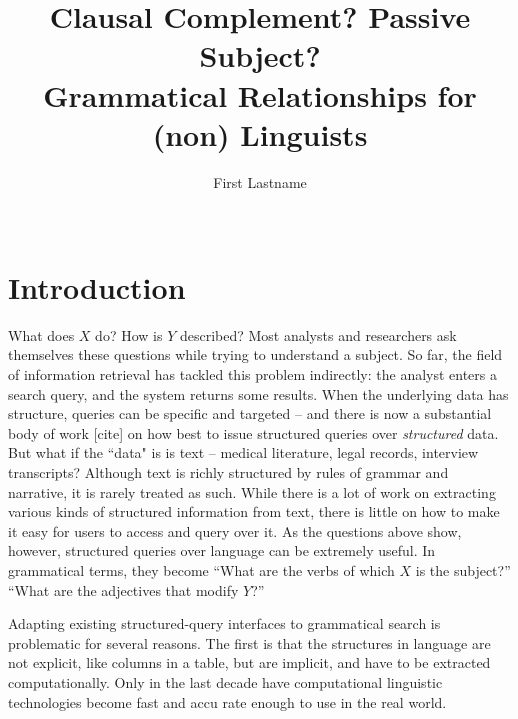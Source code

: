 \documentclass{sigchi}
\begin{document}
\title{Clausal Complement? Passive Subject?\\Grammatical Relationships for (non) Linguists}

\author{%
\alignauthor First Lastname\\
\\
}

\maketitle

\begin{abstract}

\end{abstract}

\section{Introduction}

What does $X$ do? How is $Y$ described? Most analysts and researchers ask themselves these questions while trying to understand a subject.  So far, the field of information retrieval has tackled this problem indirectly: the analyst enters a search query, and the system returns some results. When the underlying data has structure, queries can be specific and targeted -- and there is now a substantial body of work [cite] on how best to issue structured queries over \emph{structured} data. But what if the ``data" is is text -- medical literature, legal records, interview transcripts? Although text is richly structured by rules of  grammar and narrative, it is rarely treated as such. While there is a lot of work on extracting various kinds of structured information from text, there is little on how to make it easy for users to access and query over it.  As the questions above show, however, structured queries over language can be extremely useful. In grammatical terms, they become ``What are the verbs of which $X$ is the subject?'' ``What are the adjectives that modify $Y$?''

Adapting existing structured-query interfaces to grammatical search is problematic for several reasons. The first is that the structures in language are not explicit, like columns in a table, but are implicit, and have to be extracted computationally. Only in the last decade have computational linguistic technologies become fast and accu rate enough to use in the real world.
\end{document}

